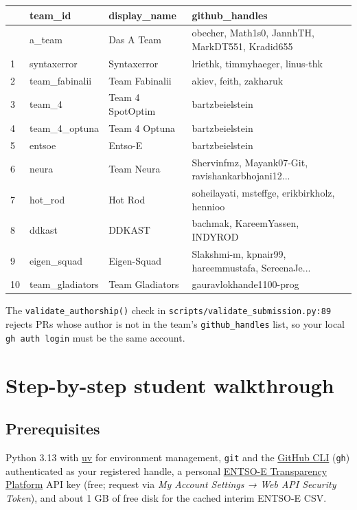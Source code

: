 \documentclass[
  english,
  letterpaper,
]{scrbook}
\newcounter{none} %
\begin{document}
\protect{}\label{live-teams}
{\def\LTcaptype{none} %
\begin{longtable}[]{@{}llll@{}}
\toprule\noalign{}
& team\_id & display\_name & github\_handles \\
\midrule\noalign{}
\endhead
\bottomrule\noalign{}
\endlastfoot
0 & a\_team & Das A Team & obecher, Math1s0, JannhTH, MarkDT551,
Kradid655 \\
1 & syntaxerror & Syntaxerror & lriethk, timmyhaeger, linus-thk \\
2 & team\_fabinalii & Team Fabinalii & akiev, feith, zakharuk \\
3 & team\_4 & Team 4 SpotOptim & bartzbeielstein \\
4 & team\_4\_optuna & Team 4 Optuna & bartzbeielstein \\
5 & entsoe & Entso-E & bartzbeielstein \\
6 & neura & Team Neura & Shervinfmz, Mayank07-Git,
ravishankarbhojani12... \\
7 & hot\_rod & Hot Rod & soheilayati, msteffge, erikbirkholz, hennioo \\
8 & ddkast & DDKAST & bachmak, KareemYassen, INDYROD \\
9 & eigen\_squad & Eigen-Squad & Slakshmi-m, kpnair99, hareemmustafa,
SereenaJe... \\
10 & team\_gladiators & Team Gladiators & gauravlokhande1100-prog \\
\end{longtable}
}

The \texttt{validate\_authorship()} check in
\texttt{scripts/validate\_submission.py:89} rejects PRs whose author is
not in the team's \texttt{github\_handles} list, so your local
\texttt{gh\ auth\ login} must be the same account.

\section{Step-by-step student walkthrough}\label{sec-live-walkthrough}

\subsection{Prerequisites}\label{prerequisites}

Python 3.13 with \href{https://docs.astral.sh/uv/}{uv} for environment
management, \texttt{git} and the \href{https://cli.github.com/}{GitHub
CLI} (\texttt{gh}) authenticated as your registered handle, a personal
\href{https://transparency.entsoe.eu/}{ENTSO-E Transparency Platform}
API key (free; request via \emph{My Account Settings → Web API Security
Token}), and about 1 GB of free disk for the cached interim ENTSO-E CSV.
\end{document}
